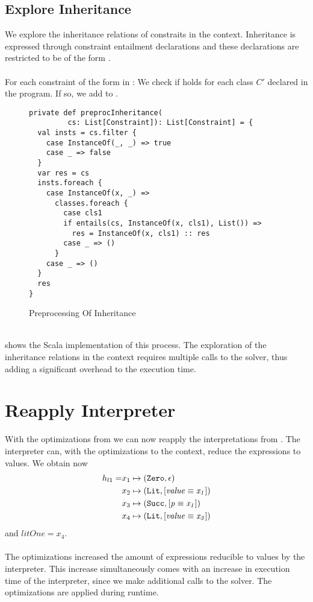 \subsection{Explore Inheritance}
We explore the inheritance relations
of constraits in the context.
Inheritance is expressed through constraint entailment declarations
and these declarations are restricted to be of the form
.\\
\\
For each constraint of the form  in :
We check if 
holds for each class $C'$ declared in the program.
If so, we add  to .
%
\begin{figure}[h]
\begin{lstlisting}
private def preprocInheritance(
         cs: List[Constraint]): List[Constraint] = {
  val insts = cs.filter {
    case InstanceOf(_, _) => true
    case _ => false
  }
  var res = cs
  insts.foreach {
    case InstanceOf(x, _) =>
      classes.foreach {
        case cls1
        if entails(cs, InstanceOf(x, cls1), List()) =>
          res = InstanceOf(x, cls1) :: res
        case _ => ()
      }
    case _ => ()
  }
  res
}
\end{lstlisting}
\caption{Preprocessing Of Inheritance}
\label{fig:scala-preproc-inheritance}
\end{figure}\\
%
 shows the
Scala implementation of this process.
The exploration of the inheritance relations
in the context requires multiple calls to the solver,
thus adding a significant overhead to the execution time.

\section{Reapply Interpreter} %
With the optimizations from 
we can now reapply the interpretations from .
The interpreter can, with the optimizations to the context,
reduce the expressions to values.
We obtain now
\begin{align*}
h_{l1} = &x_1 \mapsto (\texttt{Zero}, \epsilon)\\
         &x_2 \mapsto (\texttt{Lit}, [\mathit{\mathit{value}} \equiv \mathit{x_1}])\\
         &x_3 \mapsto (\texttt{Succ}, [\mathit{\mathit{p}} \equiv \mathit{x_1}])\\
         &x_4 \mapsto (\texttt{Lit}, [\mathit{\mathit{value}} \equiv \mathit{x_3}])
\end{align*}
and $litOne = x_4$.\\
\\
The optimizations increased the amount of expressions
reducible to values by the interpreter.
This increase simultaneously comes with an increase
in execution time of the interpreter,
since we make additional calls to the solver.
The optimizations are applied during runtime.

